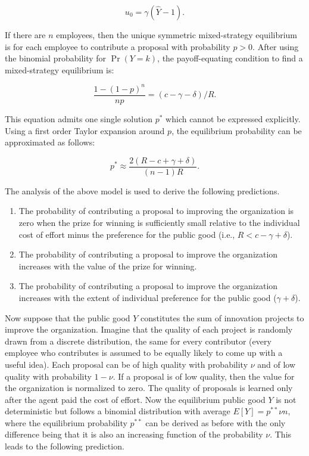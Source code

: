 \documentclass[12pt, titlepage]{article}
\begin{document}
\begin{equation}
  u_0 = \gamma (\hat Y - 1).
\end{equation}

If there are \(n\) employees, then the unique symmetric mixed-strategy
equilibrium is for each employee to contribute a proposal with
probability \(p>0\). After using the binomial probability for
\(\Pr(Y=k)\), the payoff-equating condition to find a mixed-strategy
equilibrium is:

\begin{equation} \label{eq: mixed-strategy}
  \frac{1- (1-p)^{n}}{n p} = (c- \gamma - \delta) / R.
\end{equation}

This equation admits one single solution \(p^*\) which cannot be
expressed explicitly. Using a first order Taylor expansion around \(p\),
the equilibrium probability can be approximated as follows:

\begin{equation} \label{eq: probability}
  p^*  \approx \frac{2 (R- c+\gamma +\delta )}{(n-1) R}. 
\end{equation}

The analysis of the above model is used to derive the following
predictions.

\begin{enumerate}
\def\labelenumi{\arabic{enumi})}
\item
  The probability of contributing a proposal to improving the
  organization is zero when the prize for winning is sufficiently small
  relative to the individual cost of effort minus the preference for the
  public good (i.e., \(R< c-\gamma +\delta\)).
\item
  The probability of contributing a proposal to improve the organization
  increases with the value of the prize for winning.
\item
  The probability of contributing a proposal to improve the organization
  increases with the extent of individual preference for the public good
  (\(\gamma+\delta\)).
\end{enumerate}

Now suppose that the public good \(Y\) constitutes the sum of innovation
projects to improve the organization. Imagine that the quality of each
project is randomly drawn from a discrete distribution, the same for
every contributor (every employee who contributes is assumed to be
equally likely to come up with a useful idea). Each proposal can be of
high quality with probability \(\nu\) and of low quality with
probability \(1-\nu\). If a proposal is of low quality, then the value
for the organization is normalized to zero. The quality of proposals is
learned only after the agent paid the cost of effort. Now the
equilibrium public good \(Y\) is not deterministic but follows a
binomial distribution with average \(E[Y] = p^{**} \nu n\), where the
equilibrium probability \(p^{**}\) can be derived as before with the
only difference being that it is also an increasing function of the
probability \(\nu\). This leads to the following prediction.
\end{document}
